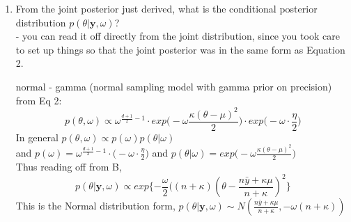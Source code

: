 \documentclass{homework}
\begin{document}
\begin{enumerate}[label=(\Alph*)]
\iffalse
You may notice that my parameterization of the normal-gamma in Equation 2 differs from, say, the one you might find in textbooks or on websites. I've chosen this parameterization in order to make these four updates for the parameters, above, as simple-looking and intuitive as possible.
Tip: this one is a bit of an algebra slog, with a lot of completing the square, collecting common terms, and cancelling positives with negatives. For example, to make the calculations go more easily, you might first show (or recall, from a previous exercise) that the likelihood can be written in the form
$$ p(\textbf{y} | \theta, \omega) \propto \omega^{n/2}exp\{ -\omega \cdot ( \frac{S_y + n(\bar{y} - \theta)^2}{2} ) \} $$
where $S_y = \Sigma_{i=1}^n (y_i - \bar{y} )^2$ is the sum of squares for the \textbf{y} vector.\\
This expresses the likelihood in terms of the two statistics $\bar{y}$ and $S_y$, which you may recall from your math-stat course are sufficient statistics for $(\theta, \sigma^2)$. Take care in ignoring constants here: some term that is constant in $\theta$ may not be constant in $\omega$, and vice versa.
\fi

\item From the joint posterior just derived, what is the conditional posterior distribution $p(\theta | \textbf{y}, \omega)$? \\
- you can read it off directly from the joint distribution, since you took care to set up things so that the joint posterior was in the same form as Equation 2.
\par* normal - gamma (normal sampling model with gamma prior on precision) from Eq 2: 
$$p(\theta, \omega) \propto \omega^{\frac{d+1}{2} - 1 } \cdot exp\big( -\omega \frac{\kappa(\theta - \mu)^2}{2} \big) \cdot exp\big( -\omega \cdot \frac{\eta}{2}\big) $$
In general $p(\theta, \omega) \propto p(\omega) p(\theta | \omega)$\\
and $p(\omega) = \omega^{\frac{d+1}{2} - 1 } \cdot \big( -\omega \cdot \frac{\eta}{2}\big)$
and $p(\theta | \omega) = exp\big( -\omega \frac{\kappa(\theta - \mu)^2}{2}\big) $\\
Thus reading off from B,  $$p(\theta | \textbf{y}, \omega) \propto exp\{ -\frac{\omega}{2}  \big( (n + \kappa)( \theta - \frac{n\bar{y} + \kappa\mu}{n + \kappa})^2\}$$
This is the Normal distribution form,  $p(\theta | \textbf{y}, \omega) \sim N(\frac{n\bar{y} + \kappa\mu}{n + \kappa}, -\omega(n + \kappa))$




\end{enumerate}
\end{document}
